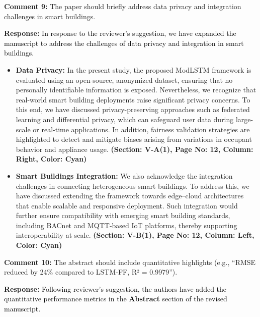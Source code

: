 \documentclass[12pt]{article}
\begin{document}
\noindent\textbf{Comment 9:} The paper should briefly address data privacy and integration challenges in smart buildings.
\vspace{0.15cm}

\hspace{-1.5em}\textbf{Response:} 
\noindent\textcolor{black}{In response to the reviewer’s suggestion, we have expanded the manuscript to address the challenges of data privacy and integration in smart buildings.}
\begin{itemize}

\item  \textbf{Data Privacy:} In the present study, the proposed ModLSTM framework is evaluated using an open-source, anonymized dataset, ensuring that no personally identifiable information is exposed. Nevertheless, we recognize that real-world smart building deployments raise significant privacy concerns. To this end, we have discussed privacy-preserving approaches such as federated learning and differential privacy, which can safeguard user data during large-scale or real-time applications. In addition, fairness validation strategies are highlighted to detect and mitigate biases arising from variations in occupant behavior and appliance usage. \textbf{(Section: V-A(1), Page No: 12, Column: Right, Color: Cyan)}

\item \textbf{Smart Buildings Integration:} We also acknowledge the integration challenges in connecting heterogeneous smart buildings. To address this, we have discussed extending the framework towards edge–cloud architectures that enable scalable and responsive deployment. Such integration would further ensure compatibility with emerging smart building standards, including BACnet and MQTT-based IoT platforms, thereby supporting interoperability at scale. \textbf{(Section: V-B(1), Page No: 12, Column: Left, Color: Cyan)}

\end{itemize}
\vspace{0.5cm}


\noindent\textbf{Comment 10:} The abstract should include quantitative highlights (e.g., “RMSE reduced by 24\% compared to LSTM-FF, R² = 0.9979”).
\vspace{0.15cm}

\hspace{-1.5em}\textbf{Response:} \noindent\textcolor{black}{ Following reviewer's suggestion, the authors have added the quantitative performance metrics in the \textbf{Abstract} section  of the revised manuscript.}
\newline
\end{document}
